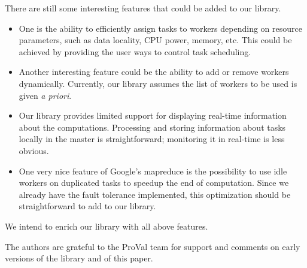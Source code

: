 \documentclass[preprint]{sigplanconf}
\begin{document}
There are still some interesting features that could be added to our
library. 
\begin{itemize}
\item 
  One is the ability to efficiently assign tasks to workers depending
  on resource parameters, such as data locality, CPU power, memory,
  etc. This could be achieved by providing the user ways to control
  task scheduling.  
\item 
  Another interesting feature could be the ability
  to add or remove workers dynamically. Currently, our library assumes
  the list of workers to be used is given \emph{a priori}.
\item
  Our library provides limited support for displaying real-time
  information about the computations. Processing and storing
  information about tasks locally in the master is straightforward; 
  monitoring it in real-time is less obvious.
\item 
  One very nice feature of Google's mapreduce is the possibility to
  use idle workers on duplicated tasks to speedup the end of computation.
  Since we already have the fault tolerance implemented, this
  optimization should be straightforward to add to our library.
\end{itemize}
We intend to enrich our library with all above features.



\acks
The authors are grateful to the ProVal team for support and comments
on early versions of the library and of this paper.

\vfill\pagebreak



\end{document}
